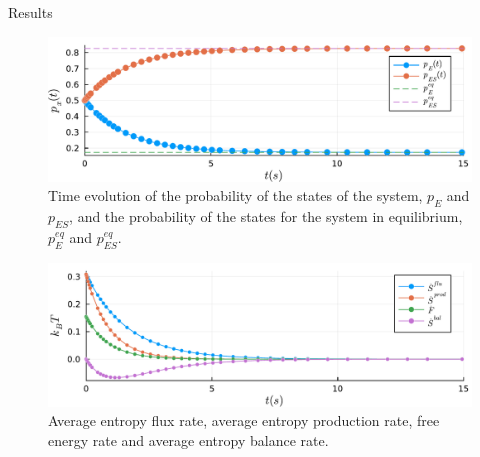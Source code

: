 \documentclass[final]{beamer}
\newlength{\colwidth}
\begin{document}
\begin{frame}[t]
\begin{columns}[t]
\begin{column}{\colwidth}
\begin{block}{Results}
\begin{figure}
\begin{center}
%
\includegraphics[scale=1.2]{graphics/f1.pdf}
\end{center}
\label{fig 2-state-system}
\caption{\justifying  Time evolution of the probability of the states of the system, $p_E$ and $p_{ES}$, and the probability of the states for the system in equilibrium, $p_E^{eq}$ and $p_{ES}^{eq}$.}
\end{figure}

\begin{figure}
\begin{center}
%
\includegraphics[scale=1.2]{graphics/f2.pdf}
\end{center}
\label{fig 2-state-system}
\caption{\justifying Average entropy flux rate, average entropy production rate, free energy rate and average entropy balance rate.}
\end{figure}


\end{block}
\end{column}
\end{columns}
\end{frame}
\end{document}
